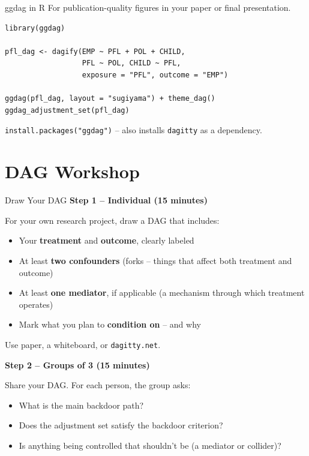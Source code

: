 \begin{frame}[fragile]{ggdag in R}
  For publication-quality figures in your paper or final presentation.

  \vspace{6pt}

\begin{lstlisting}[style=terminal]
library(ggdag)

pfl_dag <- dagify(EMP ~ PFL + POL + CHILD,
                  PFL ~ POL, CHILD ~ PFL,
                  exposure = "PFL", outcome = "EMP")

ggdag(pfl_dag, layout = "sugiyama") + theme_dag()
ggdag_adjustment_set(pfl_dag)
\end{lstlisting}

  \vspace{4pt}

  \texttt{install.packages("ggdag")} -- also installs \texttt{dagitty} as a dependency.
\end{frame}


\section{DAG Workshop}

\begin{frame}{Draw Your DAG}
  \textbf{Step 1 -- Individual (15 minutes)}

  For your own research project, draw a DAG that includes:
  \begin{itemize}
    \item Your \textbf{treatment} and \textbf{outcome}, clearly labeled
    \item At least \textbf{two confounders} (forks -- things that affect both treatment and outcome)
    \item At least \textbf{one mediator}, if applicable (a mechanism through which treatment operates)
    \item Mark what you plan to \textbf{condition on} -- and why
  \end{itemize}

  Use paper, a whiteboard, or \texttt{dagitty.net}.

  \vspace{4pt}

  \textbf{Step 2 -- Groups of 3 (15 minutes)}

  Share your DAG. For each person, the group asks:
  \begin{itemize}
    \item What is the main backdoor path?
    \item Does the adjustment set satisfy the backdoor criterion?
    \item Is anything being controlled that shouldn't be (a mediator or collider)?
  \end{itemize}
\end{frame}

